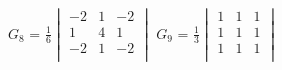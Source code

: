 \documentclass[12pt]{article}
\begin{document}
$G_8$ = $\frac{1}{6}$$\begin{vmatrix}
	-2 & 1 & -2\\
	1 & 4 & 1\\
	-2 & 1 & -2\\
\end{vmatrix}$\hspace{11mm}
$G_9$ = $\frac{1}{3}$$\begin{vmatrix}
	1 & 1 & 1\\
	1 & 1 & 1\\
	1 & 1 & 1\\
\end{vmatrix}$\hspace{5mm}
\end{document}
